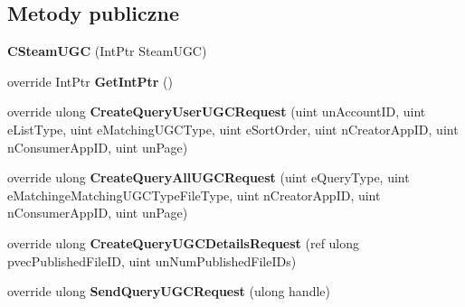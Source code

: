 \subsection*{Metody publiczne}
\begin{DoxyCompactItemize}
\item 
\mbox{\label{class_valve_1_1_steamworks_1_1_c_steam_u_g_c_a5945d374eb763d9376472d6340903560}} 
{\bfseries C\+Steam\+U\+GC} (Int\+Ptr Steam\+U\+GC)
\item 
\mbox{\label{class_valve_1_1_steamworks_1_1_c_steam_u_g_c_a356eb6c6f95390f69e6217c79d17e17d}} 
override Int\+Ptr {\bfseries Get\+Int\+Ptr} ()
\item 
\mbox{\label{class_valve_1_1_steamworks_1_1_c_steam_u_g_c_af199f097a19b3ce191d3326d380c9183}} 
override ulong {\bfseries Create\+Query\+User\+U\+G\+C\+Request} (uint un\+Account\+ID, uint e\+List\+Type, uint e\+Matching\+U\+G\+C\+Type, uint e\+Sort\+Order, uint n\+Creator\+App\+ID, uint n\+Consumer\+App\+ID, uint un\+Page)
\item 
\mbox{\label{class_valve_1_1_steamworks_1_1_c_steam_u_g_c_a7f4aa2f9b192f1e7e6931516c4898f51}} 
override ulong {\bfseries Create\+Query\+All\+U\+G\+C\+Request} (uint e\+Query\+Type, uint e\+Matchinge\+Matching\+U\+G\+C\+Type\+File\+Type, uint n\+Creator\+App\+ID, uint n\+Consumer\+App\+ID, uint un\+Page)
\item 
\mbox{\label{class_valve_1_1_steamworks_1_1_c_steam_u_g_c_a67d4b68225bd0e370f6ac6a13699c4d5}} 
override ulong {\bfseries Create\+Query\+U\+G\+C\+Details\+Request} (ref ulong pvec\+Published\+File\+ID, uint un\+Num\+Published\+File\+I\+Ds)
\item 
\mbox{\label{class_valve_1_1_steamworks_1_1_c_steam_u_g_c_ab35b0ca91f70241482df96e7c4b8a097}} 
override ulong {\bfseries Send\+Query\+U\+G\+C\+Request} (ulong handle)
\item 
\mbox{\label{class_valve_1_1_steamworks_1_1_c_steam_u_g_c_a76ff5eeb3ad4be0ca737095b574395aa}} 

\end{DoxyCompactItemize}
